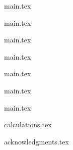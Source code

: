 \documentclass[oneside]{book}
\institute{Max Planck Institute of Quantum Optics}
\begin{document}
\MakeFrontCover

\shipout\null
\newpage
{main.tex}
\newpage
\shipout\null

\tableofcontents

{main.tex}

{main.tex}

{main.tex}

{main.tex}

{main.tex}

{main.tex}

\appendix
{calculations.tex}

\newpage
\printbibliography[heading=bibintoc]

{acknowledgments.tex}
\end{document}
